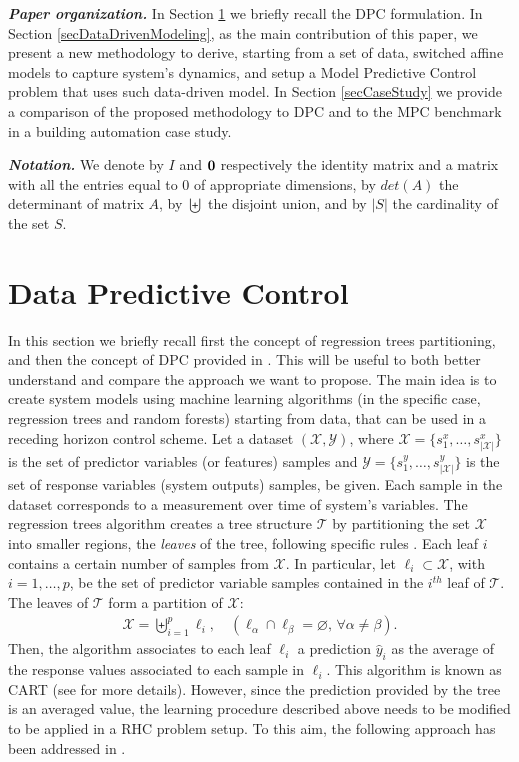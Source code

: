 \documentclass[]{ifacconf}  %
\begin{document}
\emph{\textbf{Paper organization.}} In Section \ref{secDPC} we briefly recall the DPC formulation. In Section \ref{secDataDrivenModeling}, as the main contribution of this paper, we present a new methodology to derive, starting from a set of data, switched affine models to capture system's dynamics, and setup a Model Predictive Control problem that uses such data-driven model.
In Section \ref{secCaseStudy} we provide a comparison of the proposed methodology to DPC and to the MPC benchmark in a building automation case study.

\textbf{\emph{Notation.}} We denote by $I$ and $\bold{0}$ respectively the identity matrix and a matrix with all the entries equal to $0$ of appropriate dimensions, by $det(A)$ the determinant of matrix $A$, by $\biguplus$ the disjoint union, and by $|S|$ the cardinality of the set $S$.

\section{Data Predictive Control}\label{secDPC}
In this section we briefly recall first the concept of regression trees partitioning, and then the concept of DPC provided in \cite{JainCDC2017}. 
This will be useful to both better understand and compare the approach we want to propose.
The main idea is to create system models using machine learning algorithms (in the specific case, regression trees and random forests) starting from data, that can be used in a receding horizon control scheme.
Let a dataset $(\mathcal{X},\mathcal{Y})$, where $\mathcal{X} = \{s^x_1,\ldots,s^x_{|\mathcal{X}|}\}$ is the set of predictor variables (or features) samples and $\mathcal{Y} = \{s^y_1 ,\ldots,s^y_{|\mathcal{X}|}\}$ is the set of response variables (system outputs) samples, be given.
Each sample in the dataset corresponds to a measurement over time of system's variables.
The regression trees algorithm creates a tree structure $\mathcal{T}$ by partitioning the set $\mathcal{X}$ into smaller regions, the \emph{leaves} of the tree, following specific rules \cite{Breiman1984classification}.
Each leaf $i$ contains a certain number of samples from $\mathcal{X}$.
In particular, let $\ell_{i} \subset \mathcal{X}$, with $i=1,\ldots,p$, be the set of predictor variable samples contained in the $i^{th}$ leaf of $\mathcal{T}$. The leaves of $\mathcal{T}$ form a partition of $\mathcal{X}$:
\small
\begin{align}\label{distSetPartition}
\mathcal{X}=\biguplus_{i=1}^{p}{\ell_{i}}, \quad \left(\ell_{\alpha}\cap \ell_{\beta}=\varnothing,\,\forall \alpha\neq \beta \right).
\end{align}
\normalsize
Then, the algorithm associates to each leaf $\ell_i$ a prediction $\hat{y}_i$ as the average of the response values associated to each sample in $\ell_i$. 
This algorithm is known as CART (see \cite{Breiman1984classification} for more details). 
However, since the prediction provided by the tree is an averaged value, the learning procedure described above needs to be modified to be applied in a RHC problem setup.
To this aim, the following approach has been addressed in \cite{JainCDC2017}.
\end{document}
